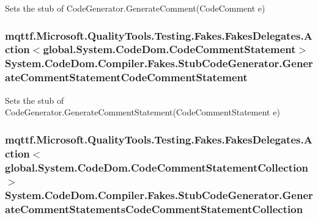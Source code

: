 Sets the stub of Code\-Generator.\-Generate\-Comment(\-Code\-Comment e)

\hypertarget{class_system_1_1_code_dom_1_1_compiler_1_1_fakes_1_1_stub_code_generator_aa81ef0c4edc7a463268fb8a3256b1e83}{
\subsubsection[{Generate\-Comment\-Statement\-Code\-Comment\-Statement}]{\setlength{\rightskip}{0pt plus 5cm}mqttf.\-Microsoft.\-Quality\-Tools.\-Testing.\-Fakes.\-Fakes\-Delegates.\-Action$<$global.\-System.\-Code\-Dom.\-Code\-Comment\-Statement$>$ System.\-Code\-Dom.\-Compiler.\-Fakes.\-Stub\-Code\-Generator.\-Generate\-Comment\-Statement\-Code\-Comment\-Statement}}\label{class_system_1_1_code_dom_1_1_compiler_1_1_fakes_1_1_stub_code_generator_aa81ef0c4edc7a463268fb8a3256b1e83}


Sets the stub of Code\-Generator.\-Generate\-Comment\-Statement(\-Code\-Comment\-Statement e)

\hypertarget{class_system_1_1_code_dom_1_1_compiler_1_1_fakes_1_1_stub_code_generator_a53bf2766d19c0972bc0a97bbd5bb4aee}{
\subsubsection[{Generate\-Comment\-Statements\-Code\-Comment\-Statement\-Collection}]{\setlength{\rightskip}{0pt plus 5cm}mqttf.\-Microsoft.\-Quality\-Tools.\-Testing.\-Fakes.\-Fakes\-Delegates.\-Action$<$global.\-System.\-Code\-Dom.\-Code\-Comment\-Statement\-Collection$>$ System.\-Code\-Dom.\-Compiler.\-Fakes.\-Stub\-Code\-Generator.\-Generate\-Comment\-Statements\-Code\-Comment\-Statement\-Collection}}\label{class_system_1_1_code_dom_1_1_compiler_1_1_fakes_1_1_stub_code_generator_a53bf2766d19c0972bc0a97bbd5bb4aee}



